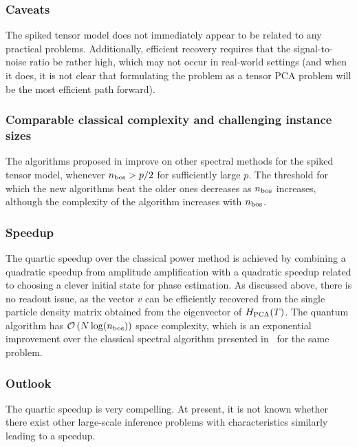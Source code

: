 \begin{refsection}
%





\subsubsection*{Caveats}
The spiked tensor model does not immediately appear to be related to any practical problems. Additionally, efficient recovery requires that the signal-to-noise ratio be rather high, which may not occur in real-world settings (and when it does, it is not clear that formulating the problem as a tensor PCA problem will be the most efficient path forward).  

\subsubsection*{Comparable classical complexity and challenging instance sizes}

The algorithms proposed in \cite{hastings2020classical} improve on other spectral methods for the spiked tensor model, whenever $n_{\rm bos}>p/2$ for sufficiently large $p$. The threshold for which the new algorithms beat the older ones decreases as $n_{\rm bos}$ increases, although the complexity of the algorithm increases with $n_{\rm bos}$. 


\subsubsection*{Speedup}
The quartic speedup over the classical power method is achieved by combining a quadratic speedup from amplitude amplification with a quadratic speedup related to choosing a clever initial state for phase estimation. 
As discussed above, there is no readout issue, as the vector $v$ can be efficiently recovered from the single particle density matrix obtained from the eigenvector of $H_{\rm PCA}(T)$. The quantum algorithm has $\mathcal{O}\left( N\log(n_{\rm bos}) \right)$ space complexity, which is an exponential improvement over the classical spectral algorithm presented in~\cite{hastings2020classical} for the same problem.


\subsubsection*{Outlook}
The quartic speedup is very compelling. At present, it is not known whether there exist other large-scale inference problems with characteristics similarly leading to a speedup. 
\printbibliography[heading=secbib,segment=\therefsegment]
\end{refsection}

